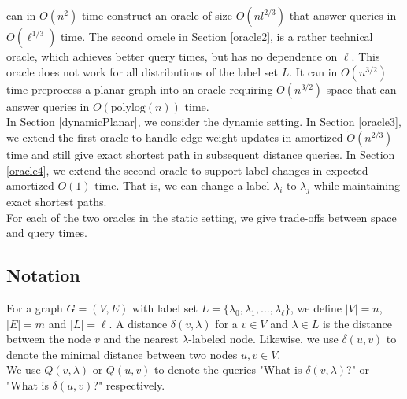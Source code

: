 can in $O(n^2)$ time construct an oracle of size $O(nl^{2/3})$ that answer queries in
$O(\ell^{1/3})$ time. The second oracle
in Section \ref{oracle2}, is a rather technical oracle, which achieves better query times, but has no dependence
on $\ell$. This oracle does not work for all distributions of the label set $L$. It can
in $O(n^{3/2})$ time preprocess a planar graph into an oracle requiring $O(n^{3/2})$
space that can answer queries in $O(\text{polylog}(n))$ time. \\
In Section \ref{dynamicPlanar}, we consider the dynamic setting. In Section
\ref{oracle3}, we extend the first oracle to handle edge
weight updates in amortized $\tilde{O}(n^{2/3})$ time and still give exact shortest path in subsequent distance queries. In Section \ref{oracle4}, we extend the second oracle to support label
changes in expected amortized $O(1)$ time. That is, we can change a label $\lambda_i$ to $\lambda_j$ while maintaining
exact shortest paths. \\
For each of the two oracles in the static setting, we give trade-offs between space and
query times.

\subsection{Notation}\label{notation}
For a graph $G=(V,E)$ with label set $L=\{\lambda_0, \lambda_1, \dots, \lambda_\ell\}$, we define $|V|=n$, $|E|=m$ and $|L|=\ell$. A
distance $\delta(v,\lambda)$ for a $v\in V$ and $\lambda\in L$ is the distance between
the node $v$ and the nearest $\lambda$-labeled node. Likewise, we use $\delta(u,v)$ to denote
the minimal distance between two nodes $u,v\in V$. \\
We use $Q(v,\lambda)$ or $Q(u,v)$ to denote the queries "What is $\delta(v,\lambda)$?" or
"What is $\delta(u,v)$?" respectively. \\
